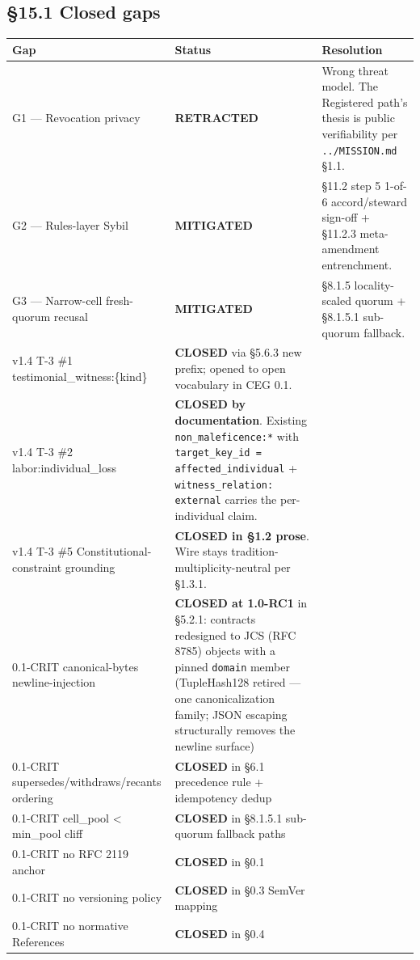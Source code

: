 \documentclass[10pt]{article}
\begin{document}
\subsection*{§15.1 Closed gaps}


{\footnotesize
\begin{longtable}{|p{5.33cm}|p{5.33cm}|p{5.33cm}|}\hline
\textbf{Gap} & \textbf{Status} & \textbf{Resolution} \\ \hline\endhead
G1 — Revocation privacy & \textbf{RETRACTED} & Wrong threat model. The Registered path's thesis is public verifiability per \texttt{../MISSION.md} §1.1. \\ \hline
G2 — Rules-layer Sybil & \textbf{MITIGATED} & §11.2 step 5 1-of-6 accord/steward sign-off + §11.2.3 meta-amendment entrenchment. \\ \hline
G3 — Narrow-cell fresh-quorum recusal & \textbf{MITIGATED} & §8.1.5 locality-scaled quorum + §8.1.5.1 sub-quorum fallback. \\ \hline
v1.4 T-3 \#1 testimonial\_witness:\{kind\} & \textbf{CLOSED} via §5.6.3 new prefix; opened to open vocabulary in CEG 0.1. &  \\ \hline
v1.4 T-3 \#2 labor:individual\_loss & \textbf{CLOSED by documentation}. Existing \texttt{non\_maleficence:*} with \texttt{target\_key\_id = affected\_individual} + \texttt{witness\_relation: external} carries the per-individual claim. &  \\ \hline
v1.4 T-3 \#5 Constitutional-constraint grounding & \textbf{CLOSED in §1.2 prose}. Wire stays tradition-multiplicity-neutral per §1.3.1. &  \\ \hline
0.1-CRIT canonical-bytes newline-injection & \textbf{CLOSED at 1.0-RC1} in §5.2.1: contracts redesigned to JCS (RFC 8785) objects with a pinned \texttt{domain} member (TupleHash128 retired — one canonicalization family; JSON escaping structurally removes the newline surface) &  \\ \hline
0.1-CRIT supersedes/withdraws/recants ordering & \textbf{CLOSED} in §6.1 precedence rule + idempotency dedup &  \\ \hline
0.1-CRIT cell\_pool < min\_pool cliff & \textbf{CLOSED} in §8.1.5.1 sub-quorum fallback paths &  \\ \hline
0.1-CRIT no RFC 2119 anchor & \textbf{CLOSED} in §0.1 &  \\ \hline
0.1-CRIT no versioning policy & \textbf{CLOSED} in §0.3 SemVer mapping &  \\ \hline
0.1-CRIT no normative References & \textbf{CLOSED} in §0.4 &  \\ \hline

\end{longtable}}
\end{document}
